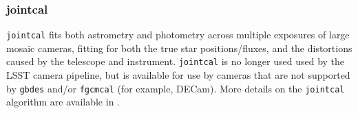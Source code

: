 \subsubsection{jointcal}
\label{sec:jointcal}

\texttt{jointcal} fits both astrometry and photometry across multiple exposures of large mosaic cameras, fitting for both the true star positions/fluxes, and the distortions caused by the telescope and instrument.
\texttt{jointcal} is no longer used used by the LSST camera pipeline, but is available for use by cameras that are not supported by \texttt{gbdes} and/or \texttt{fgcmcal} (for example, DECam).
More details on the \texttt{jointcal} algorithm are available in \citep{DMTN-036}.
